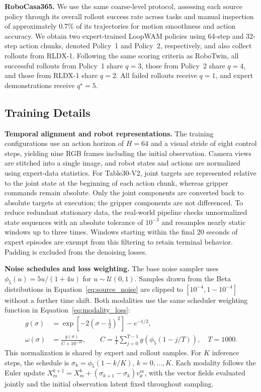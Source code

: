 \textbf{RoboCasa365.}
We use the same coarse-level protocol, assessing each source policy through its overall rollout success rate across tasks and manual inspection of approximately 0.7\% of its trajectories for motion smoothness and action accuracy.
We obtain two expert-trained LoopWAM policies using 64-step and 32-step action chunks, denoted Policy~1 and Policy~2, respectively, and also collect rollouts from RLDX-1.
Following the same scoring criteria as RoboTwin, all successful rollouts from Policy~1 share $q=3$, those from Policy~2 share $q=4$, and those from RLDX-1 share $q=2$.
All failed rollouts receive $q=1$, and expert demonstrations receive $q^\star=5$.

\subsection{Training Details}

\textbf{Temporal alignment and robot representations.}
The training configurations use an action horizon of $H=64$ and a visual stride of eight control steps, yielding nine RGB frames including the initial observation.
Camera views are stitched into a single image, and robot states and actions are normalized using expert-data statistics.
For Table30-V2, joint targets are represented relative to the joint state at the beginning of each action chunk, whereas gripper commands remain absolute.
Only the joint components are converted back to absolute targets at execution; the gripper components are not differenced.
To reduce redundant stationary data, the real-world pipeline checks unnormalized state sequences with an absolute tolerance of $10^{-3}$ and resamples nearly static windows up to three times.
Windows starting within the final 20 seconds of expert episodes are exempt from this filtering to retain terminal behavior.
Padding is excluded from the denoising losses.

\textbf{Noise schedules and loss weighting.}
The base noise sampler uses $\phi_5(u)=5u/(1+4u)$ for $u\sim\mathcal U(0,1)$.
Samples drawn from the Beta distributions in Equation~\ref{eq:source_noise} are clipped to $[10^{-4},1-10^{-4}]$ without a further time shift.
Both modalities use the same scheduler weighting function in Equation~\ref{eq:modality_loss}:
\begin{equation}
\begin{aligned}
    g(\sigma)&=\exp\!\left[-2(\sigma-\tfrac12)^2\right]-e^{-1/2},\\
    \omega(\sigma)&=\frac{g(\sigma)}{C+10^{-10}},
    \qquad C=\frac{1}{T}\sum_{j=0}^{T-1}g\!\left(\phi_5(1-j/T)\right),
    \quad T=1000.
\end{aligned}
\end{equation}
This normalization is shared by expert and rollout samples.
For $K$ inference steps, the schedule is $\sigma_k=\phi_5(1-k/K)$, $k=0,\ldots,K$.
Each modality follows the Euler update
$X_m^{k+1}=X_m^k+(\sigma_{k+1}-\sigma_k)v_\theta^m$,
with the vector fields evaluated jointly and the initial observation latent fixed throughout sampling.






